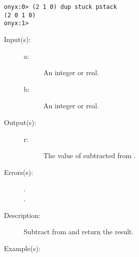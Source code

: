 \begin{description}
\begin{description}
\begin{verbatim}
onyx:0> (2 1 0) dup stuck pstack
(2 0 1 0)
onyx:1>
		\end{verbatim}
	\end{description}
\label{systemdict:sub}
\item[{\onyxop{a b}{sub}{r}}: ]
	\begin{description}\item[]
	\item[Input(s): ]
		\begin{description}\item[]
		\item[a: ]
			An integer or real.
		\item[b: ]
			An integer or real.
		\end{description}
	\item[Output(s): ]
		\begin{description}\item[]
		\item[r: ]
			The value of  subtracted from .
		\end{description}
	\item[Errors(s): ]
		\begin{description}\item[]
		\item[.]
		\item[.]
		\end{description}
	\item[Description: ]
		Subtract  from  and return the result.
	\item[Example(s): ]\begin{verbatim}


\end{verbatim}
\end{description}
\end{description}
